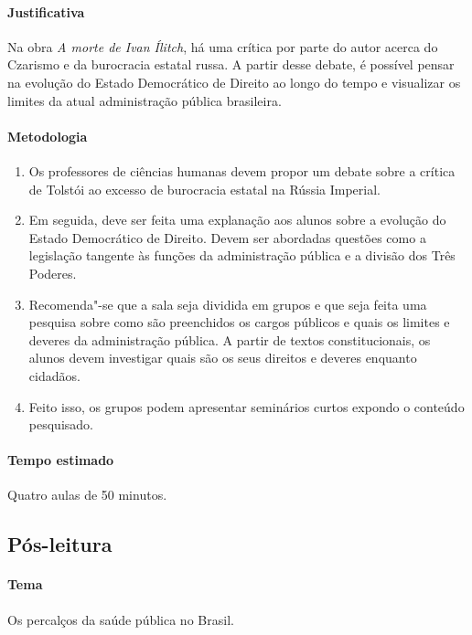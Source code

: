 \documentclass[12pt]{extarticle}
\begin{document}
\paragraph{Justificativa} Na obra \emph{A morte de Ivan Ílitch}, 
há uma crítica por parte do autor acerca do Czarismo e da burocracia estatal russa.
A partir desse debate, é possível pensar na evolução do Estado Democrático
de Direito ao longo do tempo e visualizar os limites da atual administração
pública brasileira.

\paragraph{Metodologia}

\begin{enumerate}

\item Os professores de ciências humanas devem propor um debate sobre
a crítica de Tolstói ao excesso de burocracia estatal na Rússia Imperial.

\item Em seguida, deve ser feita uma explanação aos alunos sobre a
evolução do Estado Democrático de Direito. Devem ser abordadas questões
como a legislação tangente às funções da administração
pública e a divisão dos Três Poderes.

\item Recomenda"-se que a sala seja dividida em grupos e que seja
feita uma pesquisa sobre como são preenchidos os cargos públicos
e quais os limites e deveres da administração pública.
A partir de textos constitucionais, os alunos devem investigar quais
são os seus direitos e deveres enquanto cidadãos.

\item Feito isso, os grupos podem apresentar seminários curtos expondo o
conteúdo pesquisado.

\end{enumerate}

\paragraph{Tempo estimado} Quatro aulas de 50 minutos.


\subsection{Pós-leitura}

\paragraph{Tema} Os percalços da saúde pública no Brasil.
\end{document}
